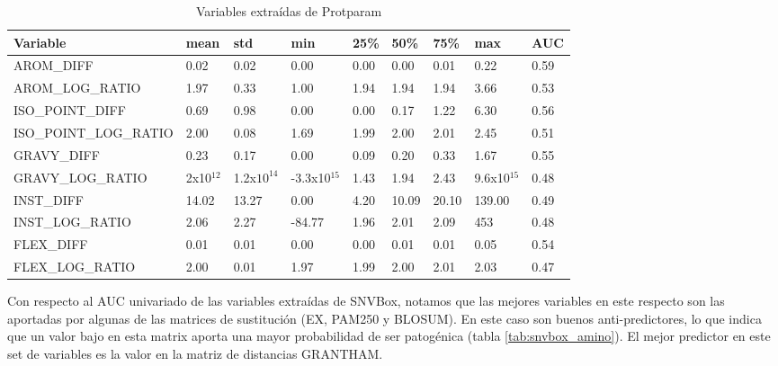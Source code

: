 \begin{table}[H]
\centering
\begin{tabular}{|l|l|l|l|l|l|l|l|l|}
\hline
Variable & mean & std & min & 25\% & 50\%  & 75\% & max & AUC \\ \hline
AROM\_DIFF  & 0.02  & 0.02  & 0.00 & 0.00 & 0.00  & 0.01 & 0.22  & 0.59 \\ \hline
AROM\_LOG\_RATIO & 1.97 & 0.33 & 1.00 & 1.94 & 1.94  & 1.94 & 3.66  & 0.53 \\ \hline
ISO\_POINT\_DIFF & 0.69  & 0.98 & 0.00  & 0.00 & 0.17  & 1.22 & 6.30  & 0.56 \\ \hline
ISO\_POINT\_LOG\_RATIO & 2.00 & 0.08 & 1.69 & 1.99 & 2.00  & 2.01 & 2.45  & 0.51 \\ \hline
GRAVY\_DIFF & 0.23 & 0.17 & 0.00 & 0.09 & 0.20  & 0.33 & 1.67  & 0.55 \\ \hline
GRAVY\_LOG\_RATIO & 2x10$^{12}$ & 1.2x$10^{14}$ & -3.3x10$^{15}$ & 1.43 & 1.94 & 2.43 & 9.6x10$^{15}$ & 0.48 \\\hline
INST\_DIFF & 14.02 & 13.27 & 0.00 & 4.20 & 10.09 & 20.10 & 139.00 & 0.49 \\ \hline
INST\_LOG\_RATIO & 2.06 & 2.27 & -84.77 & 1.96 & 2.01  & 2.09 & 453 & 0.48 \\ \hline
FLEX\_DIFF & 0.01 & 0.01 & 0.00 & 0.00 & 0.01  & 0.01  & 0.05 & 0.54 \\ \hline
FLEX\_LOG\_RATIO & 2.00 & 0.01 & 1.97 & 1.99 & 2.00  & 2.01  & 2.03 & 0.47 \\ \hline
\end{tabular}
\caption{Variables extraídas de Protparam}
\label{tab:protparam_vars}
\end{table}


Con respecto al AUC univariado de las variables extraídas de SNVBox, notamos que las mejores variables en este respecto son las aportadas por algunas de las matrices de sustitución (EX, PAM250 y BLOSUM). En este caso son buenos anti-predictores, lo que indica que un valor bajo en esta matrix aporta una mayor probabilidad de ser patogénica (tabla \ref{tab:snvbox_amino}). El mejor predictor en este set de variables es la valor en la matriz de distancias GRANTHAM.  





